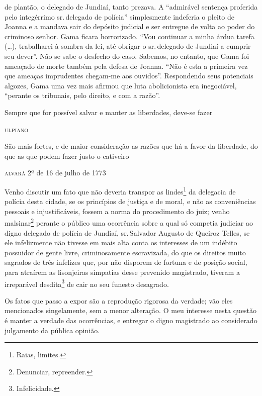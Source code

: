 \begin{didascalia}
{de plantão, o delegado de Jundiaí, tanto prezava. A ``admirável sentença
proferida pelo integérrimo sr.\,delegado de polícia'' simplesmente
indeferia o pleito de Joanna e a mandava sair do depósito judicial e ser
entregue de volta ao poder do criminoso senhor. Gama ficara horrorizado.
``Vou continuar a minha árdua tarefa (\ldots{}), trabalharei à sombra da lei,
até obrigar o sr.\,delegado de Jundiaí a cumprir seu dever''. Não se sabe
o desfecho do caso. Sabemos, no entanto, que Gama foi ameaçado de morte
também pela defesa de Joanna. ``Não é esta a primeira vez que ameaças
imprudentes chegam-me aos ouvidos''. Respondendo seus potenciais algozes,
Gama uma vez mais afirmou que luta abolicionista era inegociável,
``perante os tribunais, pelo direito, e com a razão''.}
\end{didascalia}

\epigraph{Sempre que for possível salvar e manter as liberdades, deve-se
fazer}{\textsc{ulpiano}\footnotemark}


\epigraph{São mais fortes, e de maior consideração as razões que há a favor
da liberdade, do que as que podem fazer justo o cativeiro}{\textsc{alvará 2º}
de 16 de julho de 1773}

Venho discutir um fato que não deveria transpor as lindes\footnote{
  Raias, limites.} da delegacia de polícia desta cidade, se os
princípios de justiça e de moral, e não as conveniências pessoais e
injustificáveis, fossem a norma do procedimento do juiz; venho
malsinar\footnote{ Denunciar, repreender.} perante o público uma
ocorrência sobre a qual só competia judiciar ao digno delegado de
polícia de Jundiaí, sr.\,Salvador Augusto de Queiroz Telles, se ele
infelizmente não tivesse em mais alta conta os interesses de um indébito
possuidor de gente livre, criminosamente escravizada, do que os direitos
muito sagrados de três infelizes que, por não disporem de fortuna e de
posição social, para atraírem as lisonjeiras simpatias desse prevenido
magistrado, tiveram a irreparável desdita\footnote{ Infelicidade.} de
cair no seu funesto desagrado.

Os fatos que passo a expor são a reprodução rigorosa da verdade; vão
eles mencionados singelamente, sem a menor alteração. O meu interesse
nesta questão é manter a verdade das ocorrências, e entregar o digno
magistrado ao considerado julgamento da pública opinião.

